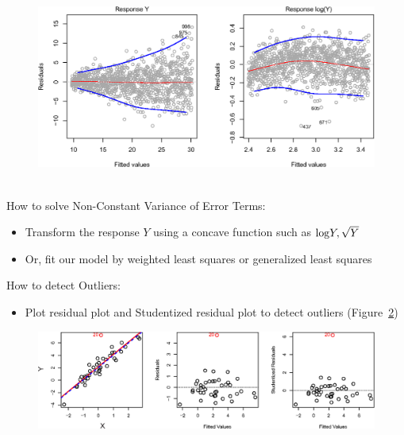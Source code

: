 \documentclass[12pt,a4paper]{article}%
\theoremstyle{definition}
\theoremstyle{plain}
\numberwithin{equation}{section}
\newcounter{subsubsubsection}[subsubsection]
\begin{document}
\begin{figure}[H]
\centering
\includegraphics[scale=0.85]{images//3_11.eps}
\\~\\
\caption{}\label{figure-3.11}
\end{figure}

How to solve Non-Constant Variance of Error Terms:
\begin{itemize}
\item Transform the response $Y$ using a concave function such as ${\rm log}Y, \sqrt{Y}$
\item Or, fit our model by weighted least squares or generalized least squares
\end{itemize}


\subsubsubsection{\color{blue}{Outliers}}
How to detect Outliers:
\begin{itemize}
\item Plot residual plot and Studentized residual plot to detect outliers (Figure~\ref{figure-3.12})
\end{itemize}

\begin{figure}[H]
\centering
\includegraphics[scale=0.85]{images//3_12.eps}
\\~\\
\caption{}\label{figure-3.12}
\end{figure}
\end{document}
